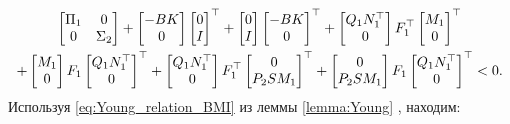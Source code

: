 \begin{multline}
	\label{eq:Young_expand}
	\begin{bmatrix}
		{\Pi}_1 & 0 \\ 0 & {\Sigma}_2 
	\end{bmatrix}+ \begin{bmatrix}
		-{BK} \\ 0
	\end{bmatrix}\begin{bmatrix}
		0 \\ {I}
	\end{bmatrix}^\top
	+\begin{bmatrix}
		0 \\ {I} 
	\end{bmatrix}\begin{bmatrix}
		-{BK} \\0
	\end{bmatrix}^\top+\begin{bmatrix}
		{Q}_1{N}_1^\top \\0
	\end{bmatrix}{F}_1^\top\begin{bmatrix}
		{M}_1 \\0
	\end{bmatrix}^\top \\ + \begin{bmatrix}
		{M}_1 \\0
	\end{bmatrix}{F}_1\begin{bmatrix}
		{Q}_1{N}_1^\top \\0
	\end{bmatrix}^\top+\begin{bmatrix}
		{Q}_1{N}_1^\top \\ 0
	\end{bmatrix}{F}_1^\top\begin{bmatrix}
		0 \\ {P}_2{S}{M}_1
	\end{bmatrix}^\top+  \begin{bmatrix}
		0\\ {P}_2{S}{M}_1
	\end{bmatrix}{F}_1\begin{bmatrix}
		{Q}_1{N}_1^\top \\0
	\end{bmatrix}^\top<0.
\end{multline}
%
Используя \eqref{eq:Young_relation_BMI} из леммы \ref{lemma:Young} \cite{KHELOUFI2013}, находим:
%
